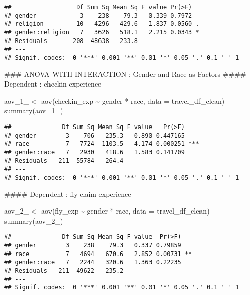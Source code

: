 \documentclass[
]{article}
\newenvironment{Shaded}{\begin{snugshade}}{\end{snugshade}}
\newcommand{\AttributeTok}[1]{\textcolor[rgb]{0.77,0.63,0.00}{#1}}
\newcommand{\FunctionTok}[1]{\textcolor[rgb]{0.00,0.00,0.00}{#1}}
\newcommand{\NormalTok}[1]{#1}
\newcommand{\OtherTok}[1]{\textcolor[rgb]{0.56,0.35,0.01}{#1}}
\newcommand{\SpecialCharTok}[1]{\textcolor[rgb]{0.00,0.00,0.00}{#1}}
\begin{document}
\begin{verbatim}
##                  Df Sum Sq Mean Sq F value Pr(>F)  
## gender            3    238    79.3   0.339 0.7972  
## religion         10   4296   429.6   1.837 0.0560 .
## gender:religion   7   3626   518.1   2.215 0.0343 *
## Residuals       208  48638   233.8                 
## ---
## Signif. codes:  0 '***' 0.001 '**' 0.01 '*' 0.05 '.' 0.1 ' ' 1
\end{verbatim}

\hfill\break
\#\#\# ANOVA WITH INTERACTION : Gender and Race as Factors \#\#\#\#
Dependent : checkin experience

\begin{Shaded}
\begin{Highlighting}[]
\NormalTok{aov\_1\_ }\OtherTok{\textless{}{-}} \FunctionTok{aov}\NormalTok{(checkin\_exp }\SpecialCharTok{\textasciitilde{}}\NormalTok{ gender }\SpecialCharTok{*}\NormalTok{ race, }\AttributeTok{data =}\NormalTok{ travel\_df\_clean)}
\FunctionTok{summary}\NormalTok{(aov\_1\_)}
\end{Highlighting}
\end{Shaded}

\begin{verbatim}
##              Df Sum Sq Mean Sq F value   Pr(>F)    
## gender        3    706   235.3   0.890 0.447165    
## race          7   7724  1103.5   4.174 0.000251 ***
## gender:race   7   2930   418.6   1.583 0.141709    
## Residuals   211  55784   264.4                     
## ---
## Signif. codes:  0 '***' 0.001 '**' 0.01 '*' 0.05 '.' 0.1 ' ' 1
\end{verbatim}

\hfill\break
\#\#\#\# Dependent : fly claim experience

\begin{Shaded}
\begin{Highlighting}[]
\NormalTok{aov\_2\_ }\OtherTok{\textless{}{-}} \FunctionTok{aov}\NormalTok{(fly\_exp }\SpecialCharTok{\textasciitilde{}}\NormalTok{ gender }\SpecialCharTok{*}\NormalTok{ race, }\AttributeTok{data =}\NormalTok{ travel\_df\_clean)}
\FunctionTok{summary}\NormalTok{(aov\_2\_)}
\end{Highlighting}
\end{Shaded}

\begin{verbatim}
##              Df Sum Sq Mean Sq F value  Pr(>F)   
## gender        3    238    79.3   0.337 0.79859   
## race          7   4694   670.6   2.852 0.00731 **
## gender:race   7   2244   320.6   1.363 0.22235   
## Residuals   211  49622   235.2                   
## ---
## Signif. codes:  0 '***' 0.001 '**' 0.01 '*' 0.05 '.' 0.1 ' ' 1
\end{verbatim}
\end{document}
